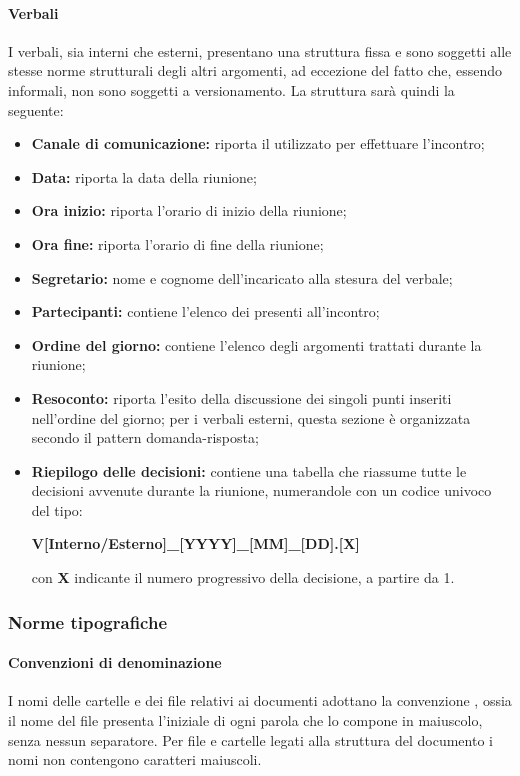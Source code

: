 \paragraph{Verbali}      
I verbali, sia interni che esterni, presentano una struttura fissa e sono soggetti alle stesse norme strutturali degli altri argomenti, ad eccezione del fatto che, essendo informali, non sono soggetti a versionamento.
La struttura sarà quindi la seguente:
\begin{itemize}
	\item \textbf{Canale di comunicazione:} riporta il  utilizzato per effettuare l'incontro;
	\item \textbf{Data:} riporta la data della riunione;
	\item \textbf{Ora inizio:} riporta l'orario di inizio della riunione;
	\item \textbf{Ora fine:} riporta l'orario di fine della riunione;
	\item \textbf{Segretario:} nome e cognome dell'incaricato alla stesura del verbale;
	\item \textbf{Partecipanti:} contiene l'elenco dei presenti all'incontro;   
	\item \textbf{Ordine del giorno:} contiene l'elenco degli argomenti trattati durante la riunione;
	\item \textbf{Resoconto:} riporta l'esito della discussione dei singoli punti inseriti nell'ordine del giorno; per i verbali esterni, questa sezione è organizzata secondo il pattern domanda-risposta;
	\item \textbf{Riepilogo delle decisioni:} contiene una tabella che riassume tutte le decisioni avvenute durante la riunione, numerandole con un codice univoco del tipo: \newline 
	\centerline{\textbf{V[Interno/Esterno]\_[YYYY]\_[MM]\_[DD].[X]}}\newline con \textbf{X} indicante il numero progressivo della decisione, a partire da 1.
\end{itemize}
\subsubsection{Norme tipografiche}
\paragraph{Convenzioni di denominazione}   
I nomi delle cartelle e dei file relativi ai documenti adottano la convenzione , ossia il nome del file presenta l'iniziale di ogni parola che lo compone in maiuscolo, senza nessun separatore. Per file e cartelle legati alla struttura del documento i nomi non contengono caratteri maiuscoli.
